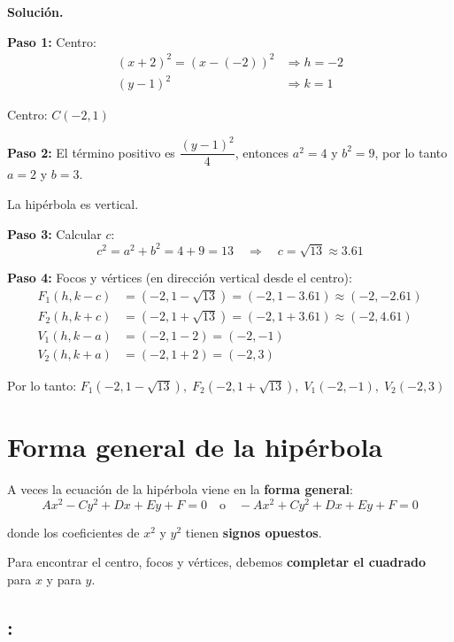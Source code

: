 \documentclass[12pt,a4paper]{article}
\begin{document}
	\bigskip

	\textbf{Solución.}

	\bigskip

	\textbf{Paso 1:} Centro:
	\[
	\begin{aligned}
		(x+2)^2=(x-(-2))^2&\Rightarrow h=-2\\
		(y-1)^2&\Rightarrow k=1
	\end{aligned}
	\]

	Centro: $\boxed{C(-2,1)}$

	\textbf{Paso 2:} El término positivo es $\dfrac{(y-1)^2}{4}$, entonces $a^2=4$ y $b^2=9$, por lo tanto $a=2$ y $b=3$.

	La hipérbola es vertical.

	\textbf{Paso 3:} Calcular $c$:
	\[
	c^2=a^2+b^2=4+9=13 \quad\Rightarrow\quad c=\sqrt{13}\approx 3.61
	\]

	\textbf{Paso 4:} Focos y vértices (en dirección vertical desde el centro):
	\[
	\begin{aligned}
		F_1(h,k-c)&=(-2,1-\sqrt{13})=(-2,1-3.61)\approx(-2,-2.61)\\
		F_2(h,k+c)&=(-2,1+\sqrt{13})=(-2,1+3.61)\approx(-2,4.61)\\
		V_1(h,k-a)&=(-2,1-2)=(-2,-1)\\
		V_2(h,k+a)&=(-2,1+2)=(-2,3)
	\end{aligned}
	\]

	Por lo tanto: $\boxed{F_1(-2,1-\sqrt{13}),\;F_2(-2,1+\sqrt{13}),\;V_1(-2,-1),\;V_2(-2,3)}$

	\section{Forma general de la hipérbola}

	A veces la ecuación de la hipérbola viene en la \textbf{forma general}:
	\[
	Ax^2-Cy^2+Dx+Ey+F=0 \quad\text{o}\quad -Ax^2+Cy^2+Dx+Ey+F=0
	\]

	donde los coeficientes de $x^2$ y $y^2$ tienen \textbf{signos opuestos}.

	\bigskip

	Para encontrar el centro, focos y vértices, debemos \textbf{completar el cuadrado} para $x$ y para $y$.

	\subsection*{{\color{blue!40!red}{Ejemplo 5}}: \color{blue!80!black}{Completar el cuadrado en una hipérbola}}
\end{document}
